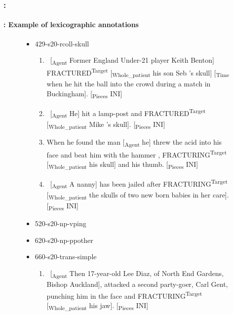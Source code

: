 \documentclass[xcolor=table]{beamer}
\begin{document}
\begin{frame}
	\frametitle{\insertshortsubtitle: \insertsection}
	\framesubtitle{\insertsubsection: Example of lexicographic annotations}
	
	\vskip-12pt
	\begin{figure}
		\begin{tcolorbox}[colback=white, colframe=blue, boxrule=1pt, text width=.91\textwidth]
			\tiny\bfseries
			\vspace{-6pt}
		\begin{itemize}
			\item 429-s20-rcoll-skull
			\begin{enumerate}\tiny
				\item \ [\textsubscript{\color{red}Agent} Former England Under-21 player Keith Benton] FRACTURED\textsuperscript{\color{red}Target} [\textsubscript{\color{red}Whole\_patient} his son Seb 's skull] [\textsubscript{\color{red}Time} when he hit the ball into the crowd during a match in Buckingham]. [\textsubscript{\color{red}Pieces} INI] 
				\item \ [\textsubscript{\color{red}Agent} He] hit a lamp-post and FRACTURED\textsuperscript{\color{red}Target} [\textsubscript{\color{red}Whole\_patient} Mike 's skull]. [\textsubscript{\color{red}Pieces} INI] 
				\item When he found the man [\textsubscript{\color{red}Agent} he] threw the acid into his face and beat him with the hammer , FRACTURING\textsuperscript{\color{red}Target} [\textsubscript{\color{red}Whole\_patient} his skull] and his thumb. [\textsubscript{\color{red}Pieces} INI] 
				\item \ [\textsubscript{\color{red}Agent} A nanny] has been jailed after FRACTURING\textsuperscript{\color{red}Target} [\textsubscript{\color{red}Whole\_patient} the skulls of two new born babies in her care]. [\textsubscript{\color{red}Pieces} INI] 
			\end{enumerate}
			\item 520-s20-np-vping
			\item 620-s20-np-ppother
			\item 660-s20-trans-simple
			\begin{enumerate}\tiny
				\item \ [\textsubscript{\color{red}Agent} Then 17-year-old Lee Diaz, of North End Gardens, Bishop Auckland], attacked a second party-goer, Carl Gent, punching him in the face and FRACTURING\textsuperscript{\color{red}Target} [\textsubscript{\color{red}Whole\_patient} his jaw]. [\textsubscript{\color{red}Pieces} INI] 
			\end{enumerate}
			

\end{itemize}
\end{tcolorbox}
\end{figure}
\end{frame}
\end{document}
